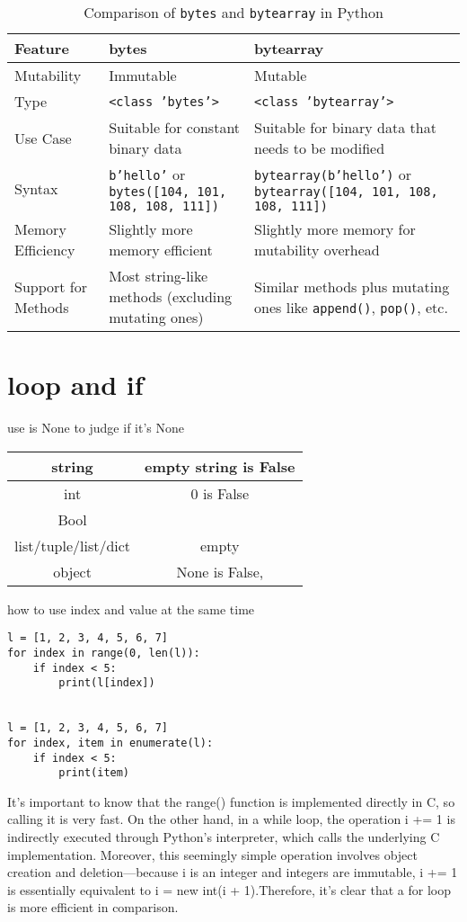 \documentclass[a4paper,12pt,twoside]{book}
\begin{document}
\begin{table}[h!]
	\centering
	\begin{tabular}{|p{}|p{}|p{}|}
		\hline
		\textbf{Feature} & \textbf{bytes} & \textbf{bytearray} \\
		\hline
		Mutability & Immutable & Mutable \\
		\hline
		Type & \texttt{<class 'bytes'>} & \texttt{<class 'bytearray'>} \\
		\hline
		Use Case & Suitable for constant binary data & Suitable for binary data that needs to be modified \\
		\hline
		Syntax & \texttt{b'hello'} or \texttt{bytes([104, 101, 108, 108, 111])} & \texttt{bytearray(b'hello')} or \texttt{bytearray([104, 101, 108, 108, 111])} \\
		\hline
		Memory Efficiency & Slightly more memory efficient & Slightly more memory for mutability overhead \\
		\hline
		Support for Methods & Most string-like methods (excluding mutating ones) & Similar methods plus mutating ones like \texttt{append()}, \texttt{pop()}, etc. \\
		\hline
	\end{tabular}
	\caption{Comparison of \texttt{bytes} and \texttt{bytearray} in Python}
\end{table}


\section{loop and if}


use is None to judge if it's None

\begin{tabular}{|c|c|}
	\hline
string 	&  empty string is False\\
	\hline
int	& 0 is False  \\
	\hline
Bool	&  \\
	\hline
list/tuple/list/dict	& empty \\
	\hline
object	&  None is False, \\
	\hline
	
\end{tabular}


how to use index and value at the same time
\begin{lstlisting}
l = [1, 2, 3, 4, 5, 6, 7]
for index in range(0, len(l)):
	if index < 5:
		print(l[index])        


l = [1, 2, 3, 4, 5, 6, 7]
for index, item in enumerate(l):
	if index < 5:
		print(item)  
\end{lstlisting}
It’s important to know that the range() function is implemented directly in C, so calling it is very fast. On the other hand, in a while loop, the operation i += 1 is indirectly executed through Python’s interpreter, which calls the underlying C implementation. Moreover, this seemingly simple operation involves object creation and deletion—because i is an integer and integers are immutable, i += 1 is essentially equivalent to i = new int(i + 1).Therefore, it's clear that a for loop is more efficient in comparison.	
\end{document}
